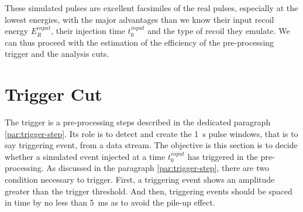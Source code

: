 These simulated pulses are excellent facsimiles of the real pulses, especially at the lowest energies, with the major advantages than we know their input recoil energy $E_R^{input}$, their injection time $t_0^{input}$ and the type of recoil they emulate. We can thus proceed with the estimation of the efficiency of the pre-processing trigger and the analysis cuts.



\section{Trigger Cut}
\label{par:trigger-cut}

The trigger is a pre-processing steps described in the dedicated paragraph \ref{par:trigger-step}. Its role is to detect and create the \SI{1}{\s} pulse windows, that is to say triggering event, from a data stream. The objective is this section is to decide whether a simulated event injected at a time $t_0^{input}$ has triggered in the pre-processing. As discussed in the paragraph \ref{par:trigger-step}, there are two condition necessary to trigger. First, a triggering event shows an amplitude greater than the trigger threshold. And then, triggering events should be spaced in time by no less than \SI{5}{\milli\s} as to avoid the pile-up effect.

